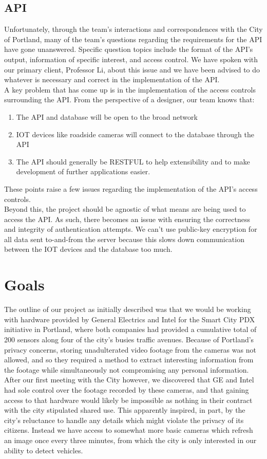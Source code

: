 \documentclass[onecolumn, draftclsnofoot,10pt, compsoc]{IEEEtran}
\begin{document}
\subsection{API}
Unfortunately, through the team's interactions and correspondences with the City of Portland, many of the team's questions regarding the requirements for the API have gone unanswered. Specific question topics include the format of the API's output, information of specific interest, and access control. We have spoken with our primary client, Professor Li, about this issue and we have been advised to do whatever is necessary and correct in the implementation of the API.\\
A key problem that has come up is in the implementation of the access controls surrounding the API. From the perspective of a designer, our team knows that:
\begin{enumerate}
    \item The API and database will be open to the broad network
    \item IOT devices like roadside cameras will connect to the database through the API
    \item The API should generally be RESTFUL to help extensibility and to make development of further applications easier.
\end{enumerate}
These points raise a few issues regarding the implementation of the API's access controls.\\
Beyond this, the project should be agnostic of what means are being used to access the API. As such, there becomes an issue with ensuring the correctness and integrity of authentication attempts. We can't use public-key encryption for all data sent to-and-from the server because this slows down communication between the IOT devices and the database too much.  

\section{Goals}
The outline of our project as initially described was that we would be working with hardware provided by General Electrics and Intel for the Smart City PDX initiative in Portland, where both companies had provided a cumulative total of 200 sensors along four of the city's busies traffic avenues. Because of Portland's privacy concerns, storing unadulterated video footage from the cameras was not allowed, and so they required a method to extract interesting information from the footage while simultaneously not compromising any personal information. After our first meeting with the City however, we discovered that GE and Intel had sole control over the footage recorded by these cameras, and that gaining access to that hardware would likely be impossible as nothing in their contract with the city stipulated shared use. This apparently inspired, in part, by the city's reluctance to handle any details which might violate the privacy of its citizens. Instead we have access to somewhat more basic cameras which refresh an image once every three minutes, from which the city is only interested in our ability to detect vehicles.
\end{document}
